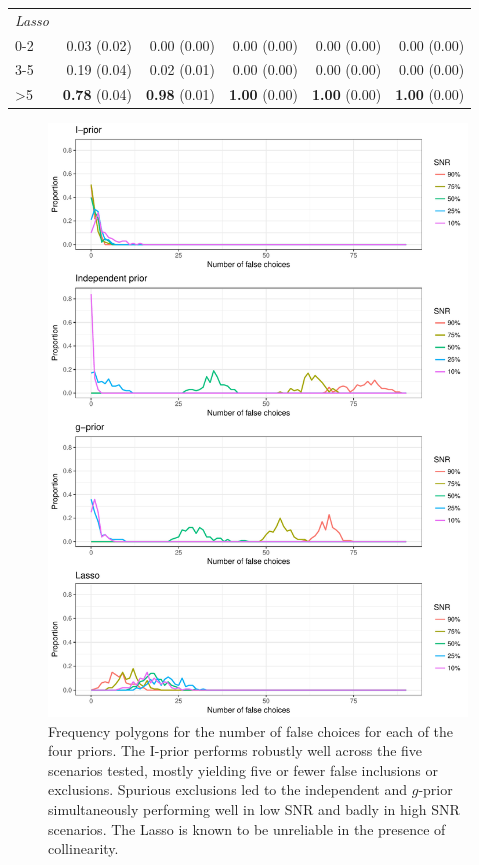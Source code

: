 \documentclass[11pt,twoside,openright]{report}
\begin{document}
\begin{table}[htb]
\begin{tabular}{lrrrrr}
\\
\emph{Lasso}\\
\hspace{0.5em}0-2 & 0.03 (0.02) & 0.00 (0.00) & 0.00 (0.00) & 0.00 (0.00) & 0.00 (0.00) \\
\hspace{0.5em}3-5 & 0.19 (0.04) & 0.02 (0.01) & 0.00 (0.00) & 0.00 (0.00) & 0.00 (0.00) \\
\hspace{0.5em}>5  & \textbf{0.78} (0.04) & \textbf{0.98} (0.01) & \textbf{1.00} (0.00) & \textbf{1.00} (0.00) & \textbf{1.00} (0.00) \\ 
\bottomrule
\end{tabular}
\end{table}

\begin{figure}[p]
  \centering
  \includegraphics[width=0.991\textwidth]{figure/bvs_simres}
  \caption[Frequency polygons for the number of false choices]{Frequency polygons for the number of false choices for each of the four priors. The I-prior performs robustly well across the five scenarios tested, mostly yielding five or fewer false inclusions or exclusions. Spurious exclusions led to the independent and $g$-prior simultaneously performing well in low SNR and  badly in high SNR scenarios. The Lasso is known to be unreliable in the presence of collinearity.}
  \label{fig:simres}
\end{figure}
\end{document}
